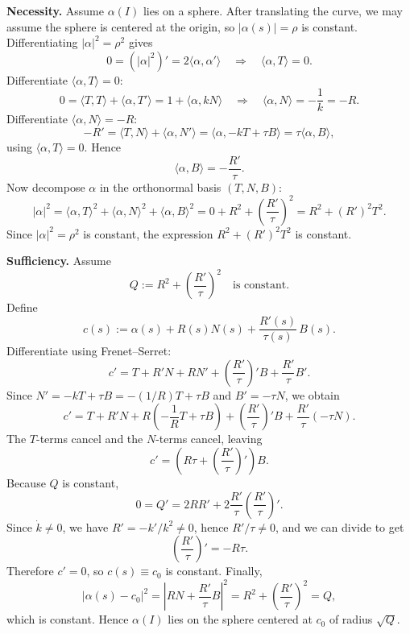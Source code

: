 \begin{solution}
\noindent\textbf{Necessity.}
	Assume $\alpha(I)$ lies on a sphere. After translating the curve, we may assume the sphere is centered at the origin,
	so $|\alpha(s)|=\rho$ is constant. Differentiating $|\alpha|^2=\rho^2$ gives
	\[
	0=(|\alpha|^2)'=2\langle \alpha,\alpha'\rangle
	\quad\Longrightarrow\quad
	\langle \alpha,T\rangle=0.
	\]
	Differentiate $\langle \alpha,T\rangle=0$:
	\[
	0=\langle T,T\rangle+\langle \alpha,T'\rangle
	=1+\langle \alpha,kN\rangle
	\quad\Longrightarrow\quad
	\langle \alpha,N\rangle=-\frac{1}{k}=-R.
	\]
	Differentiate $\langle \alpha,N\rangle=-R$:
	\[
	-R'=\langle T,N\rangle+\langle \alpha,N'\rangle
	=\langle \alpha,-kT+\tau B\rangle
	=\tau\langle \alpha,B\rangle,
	\]
	using $\langle \alpha,T\rangle=0$. Hence
	\[
	\langle \alpha,B\rangle=-\frac{R'}{\tau}.
	\]
	Now decompose $\alpha$ in the orthonormal basis $(T,N,B)$:
	\[
	|\alpha|^2=\langle \alpha,T\rangle^2+\langle \alpha,N\rangle^2+\langle \alpha,B\rangle^2
	=0+R^2+\left(\frac{R'}{\tau}\right)^2
	=R^2+(R')^2T^2.
	\]
	Since $|\alpha|^2=\rho^2$ is constant, the expression $R^2+(R')^2T^2$ is constant.
	
	\medskip
	\noindent\textbf{Sufficiency.}
	Assume
	\[
	Q:=R^2+\left(\frac{R'}{\tau}\right)^2
	\quad\text{is constant.}
	\]
	Define
	\[
	c(s):=\alpha(s)+R(s)N(s)+\frac{R'(s)}{\tau(s)}\,B(s).
	\]
	Differentiate using Frenet--Serret:
	\[
	c' = T + R'N + R N' + \left(\frac{R'}{\tau}\right)'B + \frac{R'}{\tau}B'.
	\]
	Since $N'=-kT+\tau B=-(1/R)T+\tau B$ and $B'=-\tau N$, we obtain
	\[
	c' = T + R'N + R\left(-\frac1R T + \tau B\right) + \left(\frac{R'}{\tau}\right)'B + \frac{R'}{\tau}(-\tau N).
	\]
	The $T$-terms cancel and the $N$-terms cancel, leaving
	\[
	c'=\left(R\tau+\left(\frac{R'}{\tau}\right)'\right)B.
	\]
	Because $Q$ is constant,
	\[
	0=Q' = 2RR' + 2\frac{R'}{\tau}\left(\frac{R'}{\tau}\right)'.
	\]
	Since $\dot{k}\neq 0$, we have $R'=-k'/k^2\neq 0$, hence $R'/\tau\neq 0$, and we can divide to get
	\[
	\left(\frac{R'}{\tau}\right)'=-R\tau.
	\]
	Therefore $c'=0$, so $c(s)\equiv c_0$ is constant. Finally,
	\[
	|\alpha(s)-c_0|^2
	=\left|R N + \frac{R'}{\tau}B\right|^2
	=R^2+\left(\frac{R'}{\tau}\right)^2
	=Q,
	\]
	which is constant. Hence $\alpha(I)$ lies on the sphere centered at $c_0$ of radius $\sqrt{Q}$.
\end{solution}

